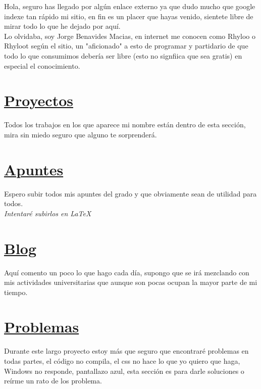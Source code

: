 \documentclass[11pt]{article}
\author{Rhyloo}
\date{\today}
\title{}
\begin{document}
\begin{description}
Hola, seguro has llegado por algún enlace externo ya que dudo mucho
que google indexe tan rápido mi sitio, en fin es un placer que hayas
venido, sientete libre de mirar todo lo que he dejado por aquí.\\

Lo olvidaba, soy Jorge Benavides Macias, en internet me conocen como
Rhyloo o Rhyloot según el sitio, un "aficionado" a esto de programar y
partidario de que todo lo que consumimos debería ser libre (esto no
signfiica que sea gratis) en especial el conocimiento.
\end{description}

\section*{\href{projects.html}{Proyectos}}
\label{sec:org0000000}
\begin{projects}
Todos los trabajos en los que aparece mi nombre están dentro de esta
sección, mira sin miedo seguro que alguno te sorprenderá.
\end{projects}
\section*{\href{exercises.html}{Apuntes}}
\label{sec:org0000001}
\begin{exercises}
 Espero subir todos mis apuntes del grado y que obviamente sean de
 utilidad para todos.\\
\emph{Intentaré subirlos en \LaTeX{}}
\end{exercises}
\section*{\href{blog.html}{Blog}}
\label{sec:org0000002}
\begin{blog}
Aquí comento un poco lo que hago cada día, supongo que se irá
mezclando con mis actividades universitarias que aunque son pocas
ocupan la mayor parte de mi tiempo.
\end{blog}
\section*{\href{problems.html}{Problemas}}
\label{sec:org0000003}
\begin{problems}
Durante este largo proyecto estoy más que seguro que encontraré
problemas en todas partes, el código no compila, el css no hace lo
que yo quiero que haga, Windows no responde, pantallazo azul, esta
sección es para darle soluciones o reírme un rato de los problema.
\end{problems}
\end{document}
